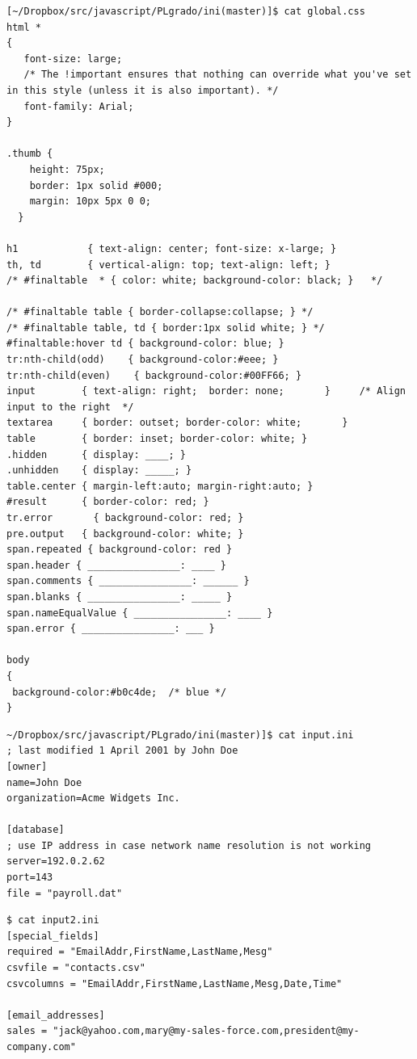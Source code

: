 \begin{verbatim}
[~/Dropbox/src/javascript/PLgrado/ini(master)]$ cat global.css
html *
{
   font-size: large; 
   /* The !important ensures that nothing can override what you've set in this style (unless it is also important). */
   font-family: Arial;
}

.thumb {
    height: 75px;
    border: 1px solid #000;
    margin: 10px 5px 0 0;
  }

h1            { text-align: center; font-size: x-large; }
th, td        { vertical-align: top; text-align: left; }   
/* #finaltable  * { color: white; background-color: black; }   */

/* #finaltable table { border-collapse:collapse; } */
/* #finaltable table, td { border:1px solid white; } */
#finaltable:hover td { background-color: blue; } 
tr:nth-child(odd)    { background-color:#eee; }
tr:nth-child(even)    { background-color:#00FF66; }
input        { text-align: right;  border: none;       }     /* Align input to the right  */
textarea     { border: outset; border-color: white;       }                        
table        { border: inset; border-color: white; }
.hidden      { display: ____; }
.unhidden    { display: _____; }
table.center { margin-left:auto; margin-right:auto; }
#result      { border-color: red; }
tr.error       { background-color: red; }
pre.output   { background-color: white; }
span.repeated { background-color: red }
span.header { ________________: ____ }
span.comments { ________________: ______ }
span.blanks { ________________: _____ }
span.nameEqualValue { ________________: ____ }
span.error { ________________: ___ }

body
{
 background-color:#b0c4de;  /* blue */
}
\end{verbatim}


\begin{verbatim}
~/Dropbox/src/javascript/PLgrado/ini(master)]$ cat input.ini 
; last modified 1 April 2001 by John Doe
[owner]
name=John Doe
organization=Acme Widgets Inc.

[database]
; use IP address in case network name resolution is not working
server=192.0.2.62     
port=143
file = "payroll.dat"
\end{verbatim}

\begin{verbatim}
$ cat input2.ini 
[special_fields] 
required = "EmailAddr,FirstName,LastName,Mesg" 
csvfile = "contacts.csv" 
csvcolumns = "EmailAddr,FirstName,LastName,Mesg,Date,Time" 

[email_addresses] 
sales = "jack@yahoo.com,mary@my-sales-force.com,president@my-company.com"
\end{verbatim}

